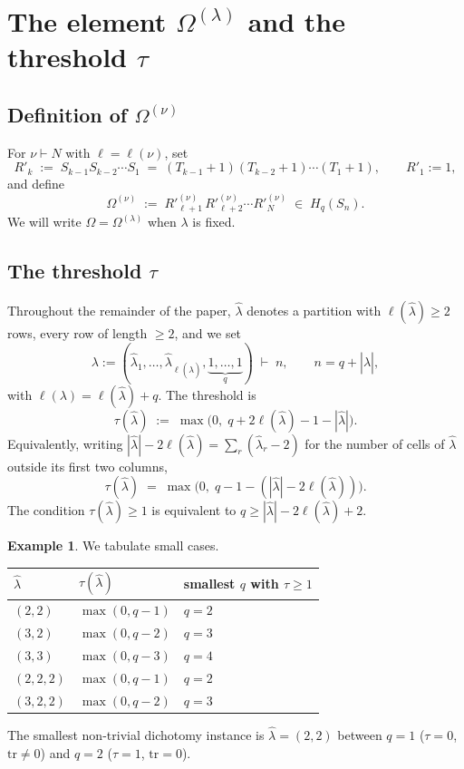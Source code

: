 \documentclass[11pt]{article}
\theoremstyle{definition}
\newtheorem{example}[theorem]{Example}
\newcommand{\Hq}{H_q}
\newcommand{\Sn}{S_n}
\newcommand{\Om}{\Omega}
\newcommand{\bla}{\widehat\lambda}
\newcommand{\elh}{\ell(\bla)}
\newcommand{\Rp}{{R'}}
\newcommand{\tr}{\mathrm{tr}}
\begin{document}
\section{The element $\Om^{(\lambda)}$ and the threshold $\tau$}\label{sec:omega-tau}

\subsection{Definition of $\Om^{(\nu)}$}

For $\nu \vdash N$ with $\ell = \ell(\nu)$, set
\[
   \Rp_k \;:=\; S_{k-1} S_{k-2} \cdots S_1
   \;=\; (T_{k-1}+1)(T_{k-2}+1)\cdots(T_1+1),
   \qquad \Rp_1 := 1,
\]
and define
\[
   \Om^{(\nu)} \;:=\; \Rp_{\ell+1}^{(\nu)}\, \Rp_{\ell+2}^{(\nu)} \cdots \Rp_N^{(\nu)}
   \;\in\; \Hq(\Sn).
\]
We will write $\Om = \Om^{(\lambda)}$ when $\lambda$ is fixed.

\subsection{The threshold $\tau$}

Throughout the remainder of the paper, $\bla$ denotes a partition with $\elh \ge 2$ rows, every row of length $\ge 2$, and we set
\[
   \lambda := (\bla_1, \ldots, \bla_{\elh}, \underbrace{1, \ldots, 1}_{q})
   \;\vdash\; n,\qquad n = q + |\bla|,
\]
with $\ell(\lambda) = \elh + q$.  The threshold is
\[
   \tau(\bla) \;:=\; \max\bigl(0,\; q + 2\elh - 1 - |\bla|\bigr).
\]
Equivalently, writing $|\bla| - 2\elh = \sum_r (\bla_r - 2)$ for the number of cells of $\bla$ outside its first two columns,
\[
   \tau(\bla) \;=\; \max\bigl(0,\; q - 1 - (|\bla| - 2\elh)\bigr).
\]
The condition $\tau(\bla) \ge 1$ is equivalent to $q \ge |\bla| - 2\elh + 2$.

\begin{example}\label{ex:tau-table}
We tabulate small cases.
\begin{center}
\begin{tabular}{l|l|l}
\toprule
$\bla$ & $\tau(\bla)$ & smallest $q$ with $\tau \ge 1$\\
\midrule
$(2,2)$       & $\max(0, q-1)$ & $q = 2$\\
$(3,2)$       & $\max(0, q-2)$ & $q = 3$\\
$(3,3)$       & $\max(0, q-3)$ & $q = 4$\\
$(2,2,2)$     & $\max(0, q-1)$ & $q = 2$\\
$(3,2,2)$     & $\max(0, q-2)$ & $q = 3$\\
\bottomrule
\end{tabular}
\end{center}
The smallest non-trivial dichotomy instance is $\bla = (2,2)$ between $q = 1$ ($\tau = 0$, $\tr \ne 0$) and $q = 2$ ($\tau = 1$, $\tr = 0$).
\end{example}
\end{document}
